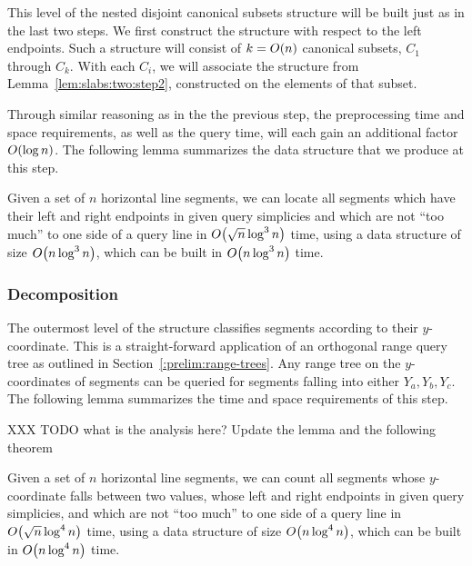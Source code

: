 This level of the nested disjoint canonical subsets structure will be built just as in the last two steps.  We first construct the structure with respect to the left endpoints.  Such a structure will consist of $k = O\!\left(n\right)$ canonical subsets, $C_1$ through $C_k$. With each $C_i$, we will associate the structure from Lemma~\ref{lem:slabs:two:step2}, constructed on the elements of that subset.

Through similar reasoning as in the the previous step, the preprocessing time and space requirements, as well as the query time, will each gain an additional factor $O\!\left(\log{n}\right)$. The following lemma summarizes the data structure that we produce at this step.

\begin{lemma}
\label{lem:slabs:two:step3}
Given a set of $n$ horizontal line segments, we can locate all segments which have their left and right endpoints in given query simplicies and which are not ``too much'' to one side of a query line in $O\!\left(\sqrt{n}\log^3{n}\right)$ time, using a data structure of size $O\!\left(n\log^3{n}\right)$, which can be built in $O\!\left(n\log^3{n}\right)$ time.
\end{lemma}


\subsubsection{Decomposition}

The outermost level of the structure classifies segments according to their $y$-coordinate. This is a straight-forward application of an orthogonal range query tree as outlined in Section~\ref{:prelim:range-trees}.  Any range tree on the $y$-coordinates of segments can be queried for segments falling into either $Y_a, Y_b, Y_c$. The following lemma summarizes the time and space requirements of this step.

XXX TODO what is the analysis here?  Update the lemma and the following theorem

\begin{lemma}
\label{lem:slabs:two:step4}
Given a set of $n$ horizontal line segments, we can count all segments whose $y$-coordinate falls between two values, whose left and right endpoints in given query simplicies, and which are not ``too much'' to one side of a query line in $O\!\left(\sqrt{n}\log^4{n}\right)$ time, using a data structure of size $O\!\left(n\log^4{n}\right)$, which can be built in $O\!\left(n\log^4{n}\right)$ time.
\end{lemma}


